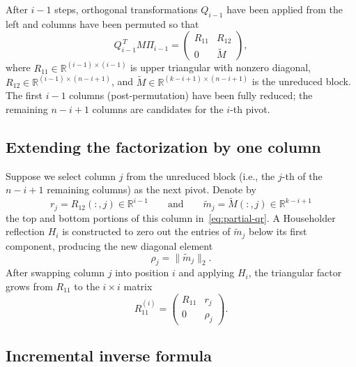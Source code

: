 \documentclass[11pt]{article}
\theoremstyle{definition}
\theoremstyle{remark}
\newcommand{\R}{\mathbb{R}}
\newcommand{\tnorm}[1]{\lVert #1 \rVert_2}
\begin{document}
After $i - 1$ steps, orthogonal transformations $Q_{i-1}$ have been
applied from the left and columns have been permuted so that
\begin{equation}\label{eq:partial-qr}
  Q_{i-1}^{\,T} M \Pi_{i-1}
  = \begin{pmatrix} R_{11} & R_{12} \\[2pt] 0 & \widetilde{M} \end{pmatrix},
\end{equation}
where $R_{11} \in \R^{(i-1) \times (i-1)}$ is upper triangular with
nonzero diagonal, $R_{12} \in \R^{(i-1) \times (n-i+1)}$, and
$\widetilde{M} \in \R^{(k-i+1) \times (n-i+1)}$ is the unreduced
block.  The first $i - 1$ columns (post-permutation) have been fully
reduced; the remaining $n - i + 1$ columns are candidates for the
$i$-th pivot.

\subsection{Extending the factorization by one column}

Suppose we select column $j$ from the unreduced block (i.e., the
$j$-th of the $n - i + 1$ remaining columns) as the next pivot.
Denote by
\[
  r_j = R_{12}(:,j) \in \R^{i-1}
  \qquad\text{and}\qquad
  \tilde{m}_j = \widetilde{M}(:,j) \in \R^{k-i+1}
\]
the top and bottom portions of this column
in~\eqref{eq:partial-qr}.  A Householder reflection $H_i$ is
constructed to zero out the entries of $\tilde{m}_j$ below its first
component, producing the new diagonal element
\begin{equation}\label{eq:rho}
  \rho_j = \tnorm{\tilde{m}_j}.
\end{equation}
After swapping column $j$ into position $i$ and applying $H_i$, the
triangular factor grows from $R_{11}$ to the $i \times i$ matrix
\begin{equation}\label{eq:R-extend}
  R_{11}^{(i)}
  = \begin{pmatrix} R_{11} & r_j \\[2pt] 0 & \rho_j \end{pmatrix}.
\end{equation}

\subsection{Incremental inverse formula}
\end{document}
